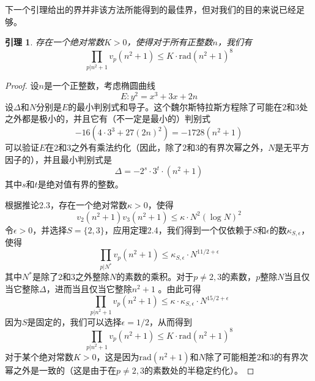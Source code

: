\documentclass{article}
\newtheorem{lemma}{引理}
\begin{document}
下一个引理给出的界并非该方法所能得到的最佳界，但对我们的目的来说已经足够。
\begin{lemma}
存在一个绝对常数\(K>0\)，使得对于所有正整数\(n\)，我们有
\[
\prod_{p | n^{2}+1} v_{p}\left(n^{2}+1\right) \leq K \cdot \text{rad}\left(n^{2}+1\right)^{8} 
\]
\end{lemma}
\begin{proof}
设\(n\)是一个正整数，考虑椭圆曲线
\[
E: y^{2}=x^{3}+3 x + 2n
\]
设\(\Delta\)和\(N\)分别是\(E\)的最小判别式和导子。这个魏尔斯特拉斯方程除了可能在\(2\)和\(3\)处之外都是极小的，并且它有（不一定是最小的）判别式
\[
-16\left(4 \cdot 3^{3}+27(2n)^{2}\right)=-1728\left(n^{2}+1\right)
\]
可以验证\(E\)在\(2\)和\(3\)之外有乘法约化（因此，除了\(2\)和\(3\)的有界次幂之外，\(N\)是无平方因子的），并且最小判别式是
\[
\Delta=-2^{s} \cdot 3^{t} \cdot\left(n^{2}+1\right)
\]
其中\(s\)和\(t\)是绝对值有界的整数。


根据推论2.3，存在一个绝对常数\(\kappa>0\)，使得
\[
v_{2}\left(n^{2}+1\right) v_{3}\left(n^{2}+1\right) \leq \kappa \cdot N^{2}(\log N)^{2} 
\]
令\(\epsilon>0\)，并选择\(S = \{2,3\}\)，应用定理2.4，我们得到一个仅依赖于\(S\)和\(\epsilon\)的数\(\kappa_{S,\epsilon}\)，使得
\[
\prod_{p | N^{*}} v_{p}\left(n^{2}+1\right) \leq \kappa_{S, \epsilon} \cdot N^{11 / 2+\epsilon}
\]
其中\(N^{*}\)是除了\(2\)和\(3\)之外整除\(N\)的素数的乘积。对于\(p\neq2,3\)的素数，\(p\)整除\(N\)当且仅当它整除\(\Delta\)，进而当且仅当它整除\(n^{2}+1\) 。由此可得
\[
\prod_{p | n^{2}+1} v_{p}\left(n^{2}+1\right) \leq \kappa \cdot \kappa_{S, \epsilon} \cdot N^{15 / 2+\epsilon} 
\]
因为\(S\)是固定的，我们可以选择\(\epsilon = 1/2\)，从而得到
\[
\prod_{p | n^{2}+1} v_{p}\left(n^{2}+1\right) \leq K \cdot \text{rad}\left(n^{2}+1\right)^{8}
\]
对于某个绝对常数\(K>0\)，这是因为\(\text{rad}(n^{2}+1)\)和\(N\)除了可能相差\(2\)和\(3\)的有界次幂之外是一致的（这是由于在\(p\neq2,3\)的素数处的半稳定约化）。
\end{proof}
\end{document}
